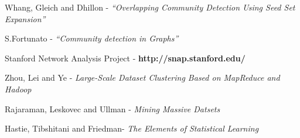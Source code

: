 \documentclass{article}
\begin{document}
\begin{thebibliography}{1}
 Whang, Gleich and Dhillon - {\em ``Overlapping Community Detection
Using Seed Set Expansion''} 

 S.Fortunato - {\em ``Community detection in Graphs''}

 Stanford Network Analysis Project - {\bf http://snap.stanford.edu/}

 Zhou, Lei and Ye - {\em Large-Scale Dataset Clustering Based on MapReduce and Hadoop}

 Rajaraman, Leskovec and Ullman - {\em Mining Massive Datsets}

 Hastie, Tibshitani and Friedman- {\em The Elements of Statistical Learning} 
  
\end{thebibliography}
\end{document}

